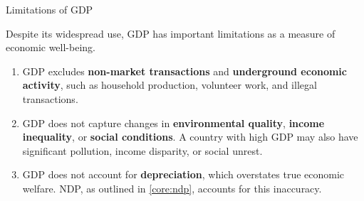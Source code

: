 \documentclass[10pt]{article}
\begin{document}
    \begin{core}{Limitations of GDP}

      Despite its widespread use, GDP has important limitations as a measure of economic well-being.

      \begin{enumerate}

        \item GDP excludes \textbf{non-market transactions} and \textbf{underground economic activity}, such as household production, volunteer work, and illegal transactions.

        \item GDP does not capture changes in \textbf{environmental quality}, \textbf{income inequality}, or \textbf{social conditions}. A country with high GDP may also have significant pollution, income disparity, or social unrest.

        \item GDP does not account for \textbf{depreciation}, which overstates true economic welfare. NDP, as outlined in \autoref{core:ndp}, accounts for this inaccuracy.

      \end{enumerate}

    \end{core}
\end{document}
